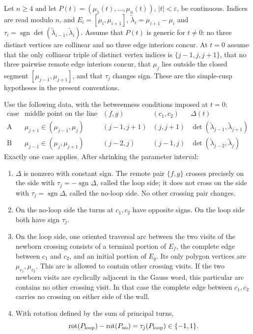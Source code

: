 \begin{lemma}\label{lem:cusp-sides}\leanok
Let $n\geq4$ and let
$P(t)=(\mu_1(t),\ldots,\mu_n(t))$, $|t|<\varepsilon$, be continuous.
Indices are read modulo $n$, and
$E_i=[\mu_i,\mu_{i+1}]$,
$\widetilde\lambda_i=\mu_{i+1}-\mu_i$ and
$\tau_i=\operatorname{sgn}\det(\widetilde\lambda_{i-1},\widetilde\lambda_i)$.
Assume that $P(t)$ is generic for $t\ne0$: no three distinct vertices are
collinear and no three edge interiors concur. At $t=0$ assume that the only
collinear triple of distinct vertex indices is $\{j-1,j,j+1\}$, that no
three pairwise remote edge interiors concur, that $\mu_j$ lies outside the
closed segment $[\mu_{j-1},\mu_{j+1}]$, and that $\tau_j$ changes sign.
These are the simple-cusp hypotheses in the present conventions.

Use the following data, with the betweenness conditions imposed at $t=0$:
\begin{equation}\label{cusppr:data}
\begin{array}{c|c|c|c|c}
\text{case}&\text{middle point on the line}&(f,g)&(c_1,c_2)&\Delta(t)\\ \hline
\mathrm A&\mu_{j+1}\in(\mu_{j-1},\mu_j)&(j-1,j+1)&(j,j+1)&
 \det(\widetilde\lambda_{j-1},\widetilde\lambda_{j+1})\\
\mathrm B&\mu_{j-1}\in(\mu_j,\mu_{j+1})&(j-2,j)&(j-1,j)&
 \det(\widetilde\lambda_{j-2},\widetilde\lambda_j)
\end{array}
\end{equation}
Exactly one case applies. After shrinking the parameter interval:
\begin{enumerate}
\item[(i)] $\Delta$ is nonzero with constant sign. The remote pair
$\{f,g\}$ crosses precisely on the side with
$\tau_j=-\operatorname{sgn}\Delta$, called the loop side; it does not cross
on the side with $\tau_j=\operatorname{sgn}\Delta$, called the no-loop side.
No other crossing pair changes.
\item[(ii)] On the no-loop side the turns at $c_1,c_2$ have opposite signs.
On the loop side both have sign $\tau_j$.
\item[(iii)] On the loop side, one oriented traversal arc between the two
visits of the newborn crossing consists of a terminal portion of $E_f$,
the complete edge between $c_1$ and $c_2$, and an initial portion of $E_g$.
Its only polygon vertices are $\mu_{c_1},\mu_{c_2}$. This arc is allowed to
contain other crossing visits. If the two newborn visits are cyclically
adjacent in the Gauss word, this particular arc contains no other crossing
visit. In that case the complete edge between $c_1,c_2$ carries no crossing
on either side of the wall.
\item[(iv)] With rotation defined by the sum of principal turns,
\begin{equation}\label{cusppr:rotation-law}
\operatorname{rot}(P_{\rm loop})-\operatorname{rot}(P_{\rm no})
=\tau_j(P_{\rm loop})\in\{-1,1\}.
\end{equation}
\end{enumerate}

\end{lemma}
